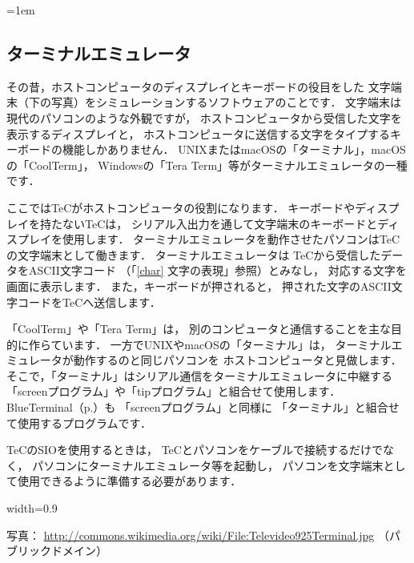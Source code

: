 \begin{framed}{\parindent=1em
    \subsection*{ターミナルエミュレータ}\label{terminal}{\small
      その昔，ホストコンピュータのディスプレイとキーボードの役目をした
      文字端末（下の写真）をシミュレーションするソフトウェアのことです．
      文字端末は現代のパソコンのような外観ですが，
      ホストコンピュータから受信した文字を表示するディスプレイと，
      ホストコンピュータに送信する文字をタイプするキーボードの機能しかありません．
      UNIXまたはmacOSの「ターミナル」，macOSの「CoolTerm」，
      Windowsの「Tera Term」等がターミナルエミュレータの一種です．

      ここではTeCがホストコンピュータの役割になります．
      キーボードやディスプレイを持たないTeCは，
      シリアル入出力を通して文字端末のキーボードとディスプレイを使用します．
      ターミナルエミュレータを動作させたパソコンはTeCの文字端末として働きます．
      ターミナルエミュレータは
      TeCから受信したデータをASCII文字コード
      （「\ref{char} 文字の表現」参照）とみなし，
      対応する文字を画面に表示します．
      また，キーボードが押されると，
      押された文字のASCII文字コードをTeCへ送信します．

      「CoolTerm」や「Tera Term」は，
      別のコンピュータと通信することを主な目的に作らています．
      一方でUNIXやmacOSの「ターミナル」は，
      ターミナルエミュレータが動作するのと同じパソコンを
      ホストコンピュータと見做します．
      そこで，「ターミナル」はシリアル通信をターミナルエミュレータに中継する
      「screenプログラム」や「tipプログラム」と組合せて使用します．
      BlueTerminal（p.\pageref{BlueTerminal}）も
      「screenプログラム」と同様に
      「ターミナル」と組合せて使用するプログラムです．

      TeCのSIOを使用するときは，
      TeCとパソコンをケーブルで接続するだけでなく，
      パソコンにターミナルエミュレータ等を起動し，
      パソコンを文字端末として使用できるように準備する必要があります．
      \begin{center}
                          {width=0.9\columnwidth}
      \end{center}
      写真：
      \url{http://commons.wikimedia.org/wiki/File:Televideo925Terminal.jpg}
          （パブリックドメイン）
}}\end{framed}

